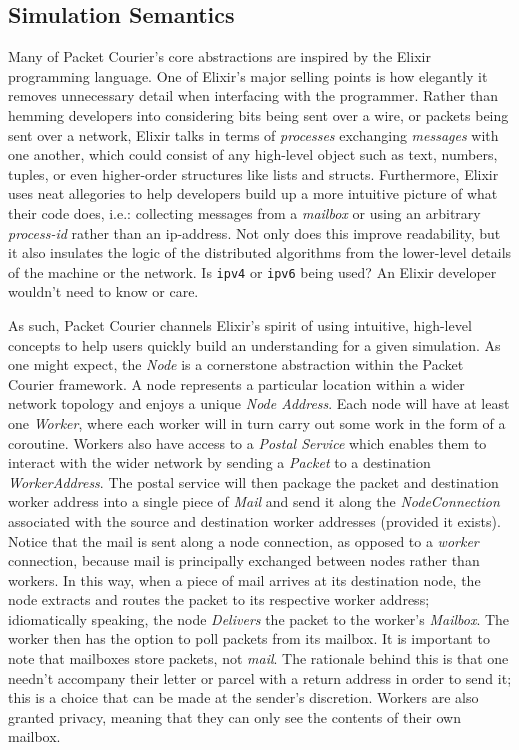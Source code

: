 \subsection{Simulation Semantics}

Many of Packet Courier's core abstractions are inspired by the Elixir programming language\cite{elixir}. One of
Elixir's major selling points is how elegantly it removes unnecessary detail when interfacing with the programmer.
Rather than hemming developers into considering bits being sent over a wire, or packets being sent over a network,
Elixir talks in terms of \emph{processes} exchanging \emph{messages} with one another, which could consist of any
high-level object such as text, numbers, tuples, or even higher-order structures like lists and structs.
Furthermore, Elixir uses neat allegories to help developers build up a more intuitive picture of what their code
does, i.e.: collecting messages from a \emph{mailbox} or using an arbitrary \emph{process-id} rather than an
ip-address. Not only does this improve readability, but it also insulates the logic of the distributed algorithms
from the lower-level details of the machine or the network. Is \texttt{ipv4} or \texttt{ipv6} being used? An Elixir
developer wouldn't need to know or care.

As such, Packet Courier channels Elixir's spirit of using intuitive, high-level concepts to help users quickly build
an understanding for a given simulation. As one might expect, the \emph{Node} is a cornerstone abstraction within the
Packet Courier framework. A node represents a particular location within a wider network topology and enjoys a unique
\emph{Node Address}. Each node will have at least one \emph{Worker}, where each worker will in turn carry out some
work in the form of a coroutine. Workers also have access to a \emph{Postal Service} which enables them to interact
with the wider network by sending a \emph{Packet} to a destination \emph{WorkerAddress}. The postal service will then
package the packet and destination worker address into a single piece of \emph{Mail} and send it along the
\emph{NodeConnection} associated with the source and destination worker addresses (provided it exists). Notice that
the mail is sent along a node connection, as opposed to a \emph{worker} connection, because mail is principally
exchanged between nodes rather than workers. In this way, when a piece of mail arrives at its destination node, the
node extracts and routes the packet to its respective worker address; idiomatically speaking, the node
\emph{Delivers} the packet to the worker's \emph{Mailbox}. The worker then has the option to poll packets from its
mailbox. It is important to note that mailboxes store packets, not \emph{mail}. The rationale behind this is that one
needn't accompany their letter or parcel with a return address in order to send it; this is a choice that can be made
at the sender's discretion. Workers are also granted privacy, meaning that they can only see the contents of their own
mailbox.


